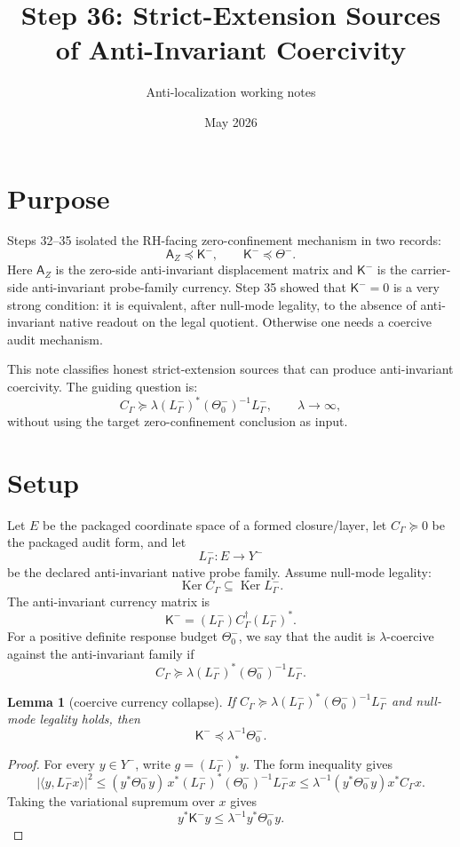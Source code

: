 \documentclass[11pt]{article}
\title{Step 36: Strict-Extension Sources of Anti-Invariant Coercivity}
\author{Anti-localization working notes}
\date{May 2026}
\newtheorem{lemma}{Lemma}
\newcommand{\K}{\mathsf K}
\newcommand{\T}{\Theta}
\newcommand{\Ker}{\operatorname{Ker}}
\begin{document}
\maketitle

\section{Purpose}
Steps 32--35 isolated the RH-facing zero-confinement mechanism in two records:
\[
\mathsf A_Z\preceq \K^-,\qquad \K^-\preceq \T^-.
\]
Here \(\mathsf A_Z\) is the zero-side anti-invariant displacement matrix and \(\K^-\) is the carrier-side anti-invariant probe-family currency.  Step 35 showed that \(\K^-=0\) is a very strong condition: it is equivalent, after null-mode legality, to the absence of anti-invariant native readout on the legal quotient.  Otherwise one needs a coercive audit mechanism.

This note classifies honest strict-extension sources that can produce anti-invariant coercivity.  The guiding question is:
\[
C_\Gamma\succeq \lambda (L^-_\Gamma)^*(\T^-_0)^{-1}L^-_\Gamma,
\qquad \lambda\to\infty,
\]
without using the target zero-confinement conclusion as input.

\section{Setup}
Let \(E\) be the packaged coordinate space of a formed closure/layer, let \(C_\Gamma\succeq0\) be the packaged audit form, and let
\[
L^-_\Gamma:E\to Y^-
\]
be the declared anti-invariant native probe family.  Assume null-mode legality:
\[
\Ker C_\Gamma\subseteq \Ker L^-_\Gamma.
\]
The anti-invariant currency matrix is
\[
\K^-=(L^-_\Gamma)C_\Gamma^\dagger(L^-_\Gamma)^*.
\]
For a positive definite response budget \(\T^-_0\), we say that the audit is \(\lambda\)-coercive against the anti-invariant family if
\[
C_\Gamma\succeq \lambda (L^-_\Gamma)^*(\T^-_0)^{-1}L^-_\Gamma.
\]

\begin{lemma}[coercive currency collapse]
If \(C_\Gamma\succeq \lambda (L^-_\Gamma)^*(\T^-_0)^{-1}L^-_\Gamma\) and null-mode legality holds, then
\[
\K^-\preceq \lambda^{-1}\T^-_0.
\]
\end{lemma}
\begin{proof}
For every \(y\in Y^-\), write \(g=(L^-_\Gamma)^*y\).  The form inequality gives
\[
|\langle y,L^-_\Gamma x\rangle|^2
\le (y^*\T^-_0 y)\, x^*(L^-_\Gamma)^*(\T^-_0)^{-1}L^-_\Gamma x
\le \lambda^{-1}(y^*\T^-_0 y)x^*C_\Gamma x.
\]
Taking the variational supremum over \(x\) gives
\[
y^*\K^- y\le \lambda^{-1}y^*\T^-_0y.
\]
\end{proof}
\end{document}

